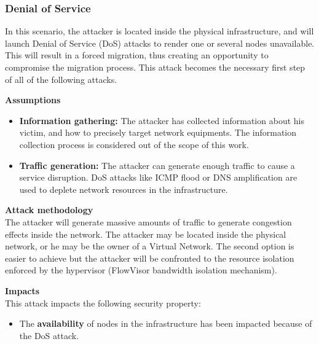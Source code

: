 \subsubsection{Denial of Service}
In this scenario, the attacker is located inside the physical infrastructure, and will launch Denial of Service (DoS) attacks to render one or several nodes unavailable.
This will result in a forced migration, thus creating an opportunity to compromise the migration process.
This attack becomes the necessary first step of all of the following attacks.

\textbf{Assumptions}
\begin{itemize}
    \item \textbf{Information gathering:} The attacker has collected information about his victim, and how to precisely target network equipments.
The information collection process is considered out of the scope of this work.
    \item \textbf{Traffic generation:} The attacker can generate enough traffic to cause a service disruption.
DoS attacks like ICMP flood or DNS amplification are used to deplete network resources in the infrastructure.
\end{itemize}

\textbf{Attack methodology}\textbf{\\}
The attacker will generate massive amounts of traffic to generate congestion effects inside the network. The attacker may be located inside the physical network, or he may be the owner of a Virtual Network. The second option is easier to achieve but the attacker will be confronted to the resource isolation enforced by the hypervisor (\ie FlowVisor bandwidth isolation mechanism).


\textbf{Impacts}\textbf{\\}
This attack impacts the following security property:
\begin{itemize}
    \item The \textbf{availability} of nodes in the infrastructure has been impacted because of the DoS attack.
\end{itemize}



